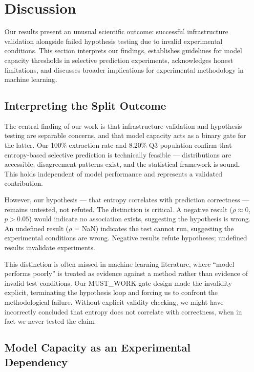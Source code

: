 \section{Discussion}

Our results present an unusual scientific outcome: successful infrastructure validation alongside failed hypothesis testing due to invalid experimental conditions. This section interprets our findings, establishes guidelines for model capacity thresholds in selective prediction experiments, acknowledges honest limitations, and discusses broader implications for experimental methodology in machine learning.

\subsection{Interpreting the Split Outcome}

The central finding of our work is that infrastructure validation and hypothesis testing are separable concerns, and that model capacity acts as a binary gate for the latter. Our 100\% extraction rate and 8.20\% Q3 population confirm that entropy-based selective prediction is technically feasible --- distributions are accessible, disagreement patterns exist, and the statistical framework is sound. This holds independent of model performance and represents a validated contribution.

However, our hypothesis --- that entropy correlates with prediction correctness --- remains untested, not refuted. The distinction is critical. A negative result ($\rho \approx 0$, $p > 0.05$) would indicate no association exists, suggesting the hypothesis is wrong. An undefined result ($\rho$ = NaN) indicates the test cannot run, suggesting the experimental conditions are wrong. Negative results refute hypotheses; undefined results invalidate experiments.

This distinction is often missed in machine learning literature, where ``model performs poorly'' is treated as evidence against a method rather than evidence of invalid test conditions. Our MUST\_WORK gate design made the invalidity explicit, terminating the hypothesis loop and forcing us to confront the methodological failure. Without explicit validity checking, we might have incorrectly concluded that entropy does not correlate with correctness, when in fact we never tested the claim.

\subsection{Model Capacity as an Experimental Dependency}

